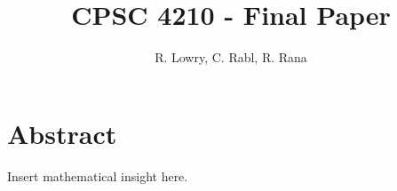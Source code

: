 \documentclass[12pt]{article}
\title{CPSC 4210 - Final Paper}
\author{R. Lowry, C. Rabl, R. Rana}
\date{}
\begin{document}
\maketitle

\section*{Abstract}

Insert mathematical insight here.



\pagebreak


\end{document}

